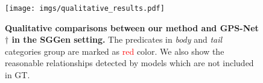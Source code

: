 \begin{figure}
   \centering
   \texttt{[image: imgs/qualitative\_results.pdf]}
   \caption{\textbf{Qualitative comparisons between our method and GPS-Net$\dagger$ in the SGGen setting.}
   The predicates in \textit{body} and \textit{tail} categories group are marked as \textcolor{red}{red} color.
   We also show the reasonable relationships detected by models which are not included in GT.}  
   \label{fig:qualitative}  
\end{figure}

